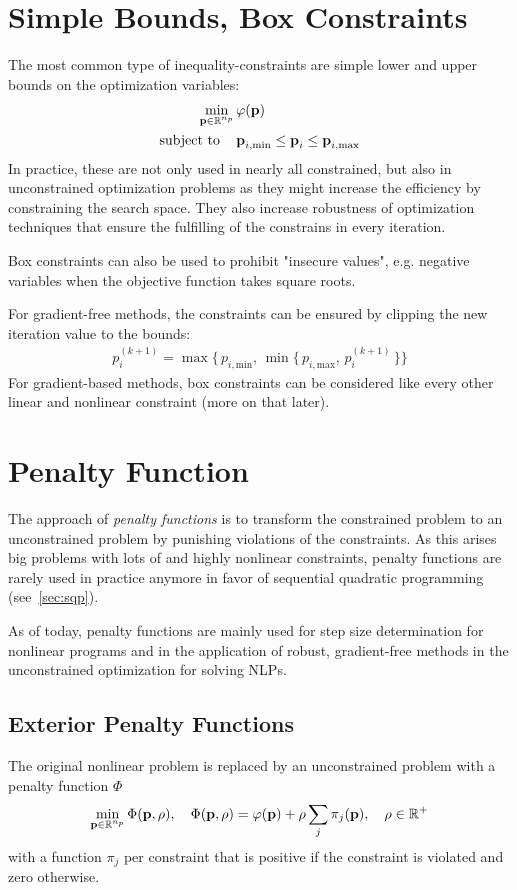 	\section{Simple Bounds, Box Constraints}
		The most common type of inequality-constraints are simple lower and upper bounds on the optimization variables:
		\begin{align*}
			\min_{\boldsymbol{\mathrm{p}} \in \mathbb{R}^{n_p}} &\, \varphi(\boldsymbol{\mathrm{p}}) \\
			\mathrm{subject~to}\quad &\,
				\boldsymbol{\mathrm{p}}_{i, \mathrm{min}} \leq \boldsymbol{\mathrm{p}}_i \leq \boldsymbol{\mathrm{p}}_{i, \mathrm{max}}
		\end{align*}
		In practice, these are not only used in nearly all constrained, but also in unconstrained optimization problems as they might increase the efficiency by constraining the search space. They also increase robustness of optimization techniques that ensure the fulfilling of the constrains in every iteration.
		
		Box constraints can also be used to prohibit "insecure values", e.g. negative variables when the objective function takes square roots.
		
		For gradient-free methods, the constraints can be ensured by clipping the new iteration value to the bounds:
		\begin{align*}
			p_i^{(k + 1)} = \max\big\{\, p_{i, \mathrm{min}},\, \min\big\{\, p_{i, \mathrm{max}},\, p_i^{(k + 1)} \,\big\} \big\}
		\end{align*}
		For gradient-based methods, box constraints can be considered like every other linear and nonlinear constraint (more on that later).

	\section{Penalty Function}
		The approach of \emph{penalty functions} is to transform the constrained problem to an unconstrained problem by punishing violations of the constraints. As this arises big problems with lots of and highly nonlinear constraints, penalty functions are rarely used in practice anymore in favor of sequential quadratic programming (see~\autoref{sec:sqp}).
		
		As of today, penalty functions are mainly used for step size determination for nonlinear programs and in the application of robust, gradient-free methods in the unconstrained optimization for solving NLPs.

		\subsection{Exterior Penalty Functions}
			The original nonlinear problem is replaced by an unconstrained problem with a penalty function \(\Phi\)
			\begin{align*}
				\min_{\boldsymbol{\mathrm{p}} \in \mathbb{R}^{n_p}} \Phi(\boldsymbol{\mathrm{p}}, \rho),\quad \Phi(\boldsymbol{\mathrm{p}}, \rho) = \varphi(\boldsymbol{\mathrm{p}}) + \rho \sum_j \pi_j(\boldsymbol{\mathrm{p}}),\quad \rho \in \mathbb{R}^+
			\end{align*}
			with a function \( \pi_j \) per constraint that is positive if the constraint is violated and zero otherwise.
			
